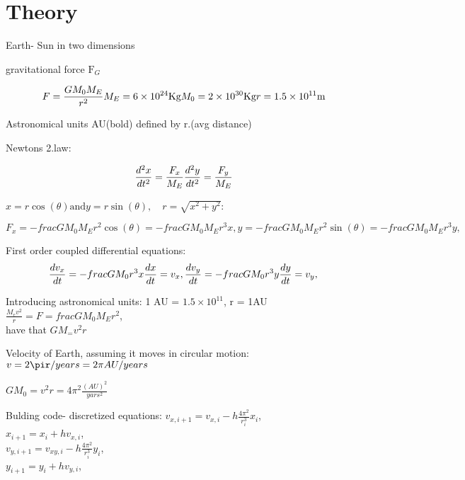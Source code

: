 \documentclass[../main.tex]{subfiles}
\begin{document}
\section{Theory}\label{theory}

Earth- Sun in two dimensions

gravitational force $\text{F}_G$

\begin{equation}
  F = \frac{GM_0M_E}{r^2}\\
  M_E = 6\times 10^{24}\text{Kg}\\
  M_0 = 2\times 10^{30}\text{Kg}\\
  r = 1.5\times 10^{11}\text{m}\\
\end{equation}

Astronomical units AU(bold) defined by r.(avg distance)

Newtons 2.law:

\begin{equation}
  \frac{d^2x}{dt^2} = \frac{F_x}{M_E}\\
  \frac{d^2y}{dt^2} = \frac{F_y}{M_E}\\
\end{equation}

$x = r \cos(\theta) \text{and} y = r\sin(\theta), \quad r = \sqrt{x^2 +y^2}$:

\begin{equation}
  F_x = - frac{GM_0M_E}{r^2}\cos(\theta) =- frac{GM_0M_E}{r^3}x,
  y = - frac{GM_0M_E}{r^2}\sin(\theta) =- frac{GM_0M_E}{r^3}y,
\end{equation}

First order  coupled differential equations:
\begin{equation}
  \frac{dv_x}{dt} = - frac{GM_0}{r^3}x\\
  \frac{dx}{dt} = v_x,\\
  \frac{dv_y}{dt} = - frac{GM_0}{r^3}y\\
  \frac{dy}{dt} = v_y,\\
\end{equation}

Introducing astronomical units: 1 AU = $1.5 \times 10^{11}$, r = 1AU
$\frac{M_ev^2}{r} = F = frac{GM_0M_E}{r^2}$,\\
have that
$GM_=  v^2r$

Velocity of Earth, assuming it moves in circular motion: $v = 2\pir/years= 2\pi AU/years$

$GM_0 = v^2r = 4\pi^2 \frac{(AU)^2}{yars^2}$

Bulding code- discretized equations:
$v_{x,i+1} = v_{x,i} - h \frac{4\pi^2}{r_i^3}x_i$,\\
$x_{i+1} = x_{i} + hv_{x,i}$,\\
$v_{y,i+1} = v_{xy,i} - h \frac{4\pi^2}{r_i^3}y_i$,\\
$y_{i+1} = y_{i} + hv_{y,i}$,\\
\end{document}
